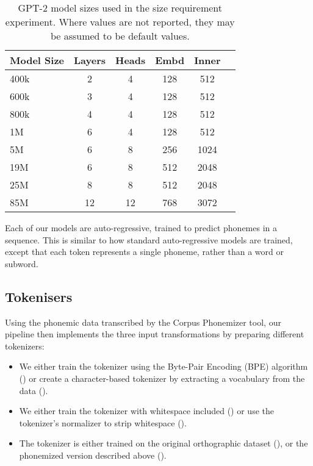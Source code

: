 \begin{table}[!ht]
    \centering
    \small
    \begin{tabular}{lccccc}
    \toprule
         Model Size & Layers & Heads & Embd & Inner \\
         \midrule
         400k & 2 & 4 & 128 & 512 \\ 
         600k & 3 & 4 & 128 & 512 \\ 
         800k & 4 & 4 & 128 & 512 \\ 
         1M & 6 & 4 & 128 & 512 \\ 
         5M & 6 & 8 & 256 & 1024 \\ 
         19M & 6 & 8 & 512 & 2048 \\ 
         25M & 8 & 8 & 512 & 2048 \\ 
         85M & 12 & 12 & 768 & 3072 \\ 
    \bottomrule
    \end{tabular}
    \caption{GPT-2 model sizes used in the size requirement experiment. Where values are not reported, they may be assumed to be default values.}
    \label{tab:13-model_sizes}
\end{table}

Each of our models are auto-regressive, trained to predict phonemes in a sequence. This is similar to how standard auto-regressive models are trained, except that each token represents a single phoneme, rather than a word or subword. 

\subsection{Tokenisers}\label{sec:14-tokenisers}

Using the phonemic data transcribed by the Corpus Phonemizer tool, our pipeline then implements the three input transformations by preparing different tokenizers:

\begin{itemize}
\setlength\itemsep{0.1em}
    \item {} We either train the tokenizer using the Byte-Pair Encoding (BPE) algorithm \citep{sennrich-etal-2016-bpe} (\xmark) or create a character-based tokenizer by extracting a vocabulary from the data (\cmark).
    \item {} We either train the tokenizer with whitespace included (\xmark) or use the tokenizer's normalizer to strip whitespace (\cmark).  
    \item {} The tokenizer is either trained on the original orthographic dataset (\xmark), or the phonemized version described above (\cmark).
\end{itemize}

